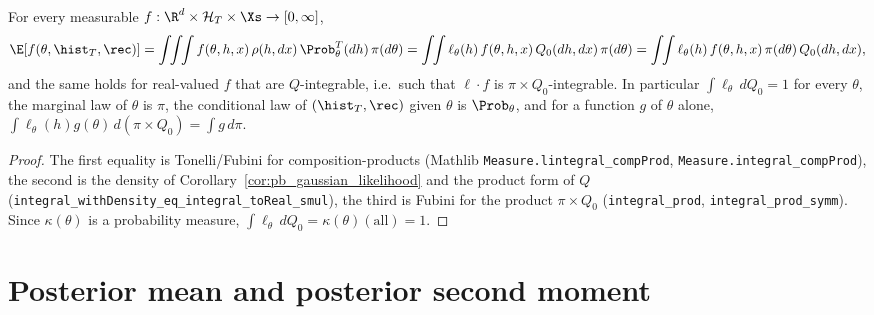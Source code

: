 \begin{lemma}\label{lem:pb_joint_fubini}
\leanok
{}
For every measurable $f : \R^d\times\mathcal{H}_T\times\Xs\to[0,\infty]$,
\[
  \E[f(\theta,\hist_T,\rec)]
  = \int\!\!\int\!\!\int f(\theta,h,x)\,\rho(h,dx)\,\Prob_\theta^T(dh)\,\pi(d\theta)
  = \int\!\!\int\ell_\theta(h)\,f(\theta,h,x)\,Q_0(dh,dx)\,\pi(d\theta)
  = \int\!\!\int\ell_\theta(h)\,f(\theta,h,x)\,\pi(d\theta)\,Q_0(dh,dx),
\]
and the same holds for real-valued $f$ that are $Q$-integrable, i.e.\ such that
$\ell\cdot f$ is $\pi\times Q_0$-integrable. In particular $\int\ell_\theta\,dQ_0 = 1$ for every
$\theta$, the marginal law of $\theta$ is $\pi$, the conditional law
of $(\hist_T,\rec)$ given $\theta$ is $\Prob_\theta$, and for a function $g$ of $\theta$ alone,
$\int\ell_\theta(h)g(\theta)\,d(\pi\times Q_0) = \int g\,d\pi$.
\end{lemma}

\begin{proof}
\leanok
{}
The first equality is Tonelli/Fubini for composition-products (Mathlib
\texttt{Measure.lintegral\_compProd}, \texttt{Measure.integral\_compProd}), the second is the
density of Corollary~\ref{cor:pb_gaussian_likelihood} and the product form of $Q$
(\texttt{integral\_withDensity\_eq\_integral\_toReal\_smul}), the third is Fubini for the product
$\pi\times Q_0$ (\texttt{integral\_prod}, \texttt{integral\_prod\_symm}). Since
$\kappa(\theta)$ is a probability measure, $\int\ell_\theta\,dQ_0 = \kappa(\theta)(\text{all}) = 1$.
\end{proof}

\section{Posterior mean and posterior second moment}
\label{sec:pre_bayes_posterior}

